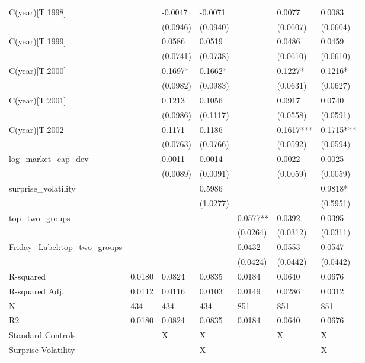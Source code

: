 \begin{tabular}{lllllll}
C(year)[T.1998] &  & -0.0047 & -0.0071 &  & 0.0077 & 0.0083 \\
 &  & (0.0946) & (0.0940) &  & (0.0607) & (0.0604) \\
C(year)[T.1999] &  & 0.0586 & 0.0519 &  & 0.0486 & 0.0459 \\
 &  & (0.0741) & (0.0738) &  & (0.0610) & (0.0610) \\
C(year)[T.2000] &  & 0.1697* & 0.1662* &  & 0.1227* & 0.1216* \\
 &  & (0.0982) & (0.0983) &  & (0.0631) & (0.0627) \\
C(year)[T.2001] &  & 0.1213 & 0.1056 &  & 0.0917 & 0.0740 \\
 &  & (0.0986) & (0.1117) &  & (0.0558) & (0.0591) \\
C(year)[T.2002] &  & 0.1171 & 0.1186 &  & 0.1617*** & 0.1715*** \\
 &  & (0.0763) & (0.0766) &  & (0.0592) & (0.0594) \\
log_market_cap_dev &  & 0.0011 & 0.0014 &  & 0.0022 & 0.0025 \\
 &  & (0.0089) & (0.0091) &  & (0.0059) & (0.0059) \\
surprise_volatility &  &  & 0.5986 &  &  & 0.9818* \\
 &  &  & (1.0277) &  &  & (0.5951) \\
top_two_groups &  &  &  & 0.0577** & 0.0392 & 0.0395 \\
 &  &  &  & (0.0264) & (0.0312) & (0.0311) \\
Friday_Label:top_two_groups &  &  &  & 0.0432 & 0.0553 & 0.0547 \\
 &  &  &  & (0.0424) & (0.0442) & (0.0442) \\
R-squared & 0.0180 & 0.0824 & 0.0835 & 0.0184 & 0.0640 & 0.0676 \\
R-squared Adj. & 0.0112 & 0.0116 & 0.0103 & 0.0149 & 0.0286 & 0.0312 \\
N & 434 & 434 & 434 & 851 & 851 & 851 \\
R2 & 0.0180 & 0.0824 & 0.0835 & 0.0184 & 0.0640 & 0.0676 \\
Standard Controls &  & X & X &  & X & X \\
Surprise Volatility &  &  & X &  &  & X \\
\bottomrule
\end{tabular}
